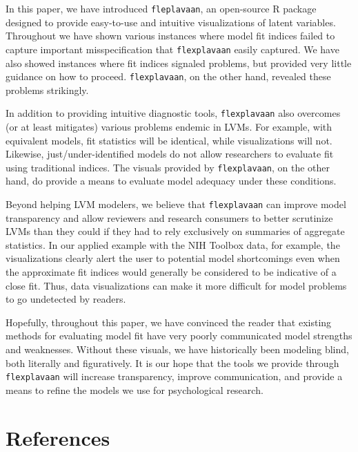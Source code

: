 \documentclass[
  english,
  man]{apa6}
\begin{document}
In this paper, we have introduced \texttt{fleplavaan}, an open-source R package designed to provide easy-to-use and intuitive visualizations of latent variables. Throughout we have shown various instances where model fit indices failed to capture important misspecification that \texttt{flexplavaan} easily captured. We have also showed instances where fit indices signaled problems, but provided very little guidance on how to proceed. \texttt{flexplavaan}, on the other hand, revealed these problems strikingly.

In addition to providing intuitive diagnostic tools, \texttt{flexplavaan} also overcomes (or at least mitigates) various problems endemic in LVMs. For example, with equivalent models, fit statistics will be identical, while visualizations will not. Likewise, just/under-identified models do not allow researchers to evaluate fit using traditional indices. The visuals provided by \texttt{flexplavaan}, on the other hand, do provide a means to evaluate model adequacy under these conditions.

Beyond helping LVM modelers, we believe that \texttt{flexplavaan} can improve model transparency and allow reviewers and research consumers to better scrutinize LVMs than they could if they had to rely exclusively on summaries of aggregate statistics. In our applied example with the NIH Toolbox data, for example, the visualizations clearly alert the user to potential model shortcomings even when the approximate fit indices would generally be considered to be indicative of a close fit. Thus, data visualizations can make it more difficult for model problems to go undetected by readers.

Hopefully, throughout this paper, we have convinced the reader that existing methods for evaluating model fit have very poorly communicated model strengths and weaknesses. Without these visuals, we have historically been modeling blind, both literally and figuratively. It is our hope that the tools we provide through \texttt{flexplavaan} will increase transparency, improve communication, and provide a means to refine the models we use for psychological research.

\hypertarget{references}{%
\section{References}\label{references}}
\end{document}
